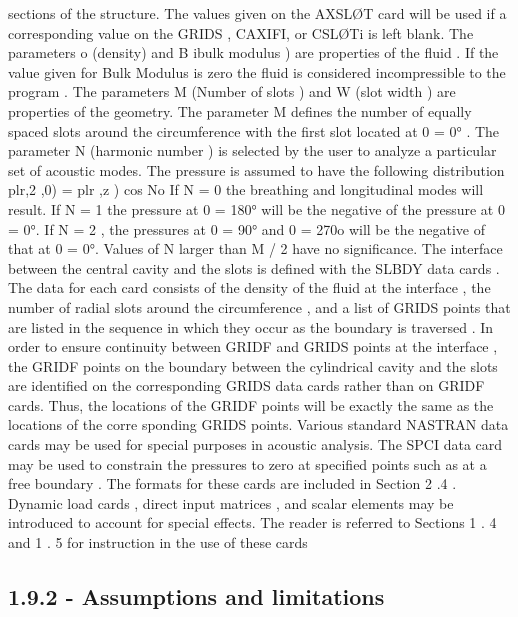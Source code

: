 \documentclass{article}
\begin{document}
sections of the structure. The values given on the AXSLØT card will be used if a corresponding
value on the GRIDS , CAXIFI, or CSLØTi is left blank. The parameters o (density) and B ibulk
modulus ) are properties of the fluid .
If the value given for Bulk Modulus is zero the fluid is
considered incompressible to the program . The parameters M (Number of slots ) and W (slot width )
are properties of the geometry. The parameter M defines the number of equally spaced slots
around the circumference with the first slot located at 0 = 0° . The parameter N (harmonic number )
is selected by the user to analyze a particular set of acoustic modes.
The pressure is assumed
to have the following distribution
plr,2 ,0) = plr ,z ) cos No
If N = 0 the breathing and longitudinal modes will result.
If N = 1 the pressure at 0 = 180°
will be the negative of the pressure at 0 = 0°. If N = 2 , the pressures at 0 = 90° and 0 = 270o
will be the negative of that at 0 = 0°. Values of N larger than M / 2 have no significance.
The interface between the central cavity and the slots is defined with the SLBDY data cards .
The data for each card consists of the density of the fluid at the interface , the number of radial
slots around the circumference , and a list of GRIDS points that are listed in the sequence in
which they occur as the boundary is traversed . In order to ensure continuity between GRIDF and
GRIDS points at the interface , the GRIDF points on the boundary between the cylindrical cavity
and the slots are identified on the corresponding GRIDS data cards rather than on GRIDF cards.
Thus, the locations of the GRIDF points will be exactly the same as the locations of the corre
sponding GRIDS points.
Various standard NASTRAN data cards may be used for special purposes in acoustic analysis.
The SPCI data card may be used to constrain the pressures to zero at specified points such as at
a free boundary . The formats for these cards are included in Section 2 .4 . Dynamic load cards ,
direct input matrices , and scalar elements may be introduced to account for special effects.
The
reader is referred to Sections 1 . 4 and 1 . 5 for instruction in the use of these cards

\subsection{1.9.2 - Assumptions and limitations}
\end{document}
